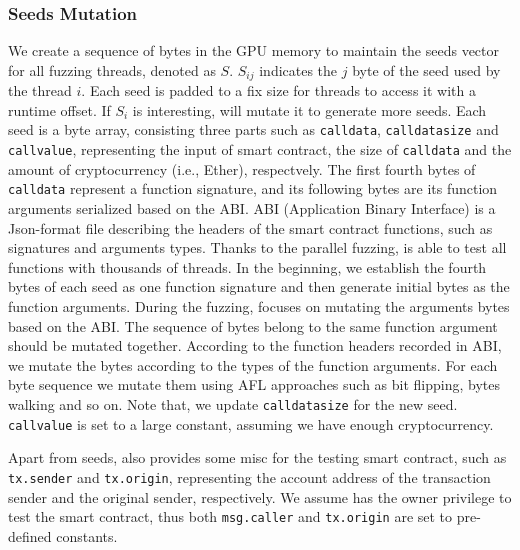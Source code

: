 \subsubsection{Seeds Mutation}
\label{design:mutation}
We create a sequence of bytes in the GPU memory to maintain the seeds vector for all fuzzing threads, denoted as $S$.  
$S_{ij}$ indicates the $j$ byte of the seed used by the thread $i$.  
Each seed is padded to a fix size for threads to access it with a runtime offset.
If $S_i$ is interesting, {\runner} will mutate it to generate more seeds. 
Each seed is a byte array, consisting three parts such as \texttt{calldata}, \texttt{calldatasize} and \texttt{callvalue}, representing the input of smart contract, the size of \texttt{calldata} and the amount of cryptocurrency (i.e., Ether), respectvely.  
%
The first fourth bytes of \texttt{calldata} represent a function signature, and its following bytes are its function arguments serialized based on the ABI.
ABI (Application Binary Interface) is a Json-format file describing the headers of the smart contract functions, such as signatures and arguments types. 
Thanks to the parallel fuzzing, {\runner} is able to test all functions with thousands of threads. 
In the beginning, we establish the fourth bytes of each seed as one function signature and then generate initial bytes as the function arguments.
During the fuzzing, {\runner} focuses on mutating the arguments bytes based on the ABI.
The sequence of bytes belong to the same function argument should be mutated together.
%
%
%
%
%
According to the function headers recorded in ABI, we mutate the bytes according to the types of the function arguments. 
For each byte sequence we mutate them using AFL\cite{afl} approaches such as bit flipping, bytes walking and so on.
Note that, we update \texttt{calldatasize} for the new seed. \texttt{callvalue} is set to a large constant, assuming we have enough cryptocurrency. 

Apart from seeds, {\runner} also provides some misc for the testing smart contract, such as  \texttt{tx.sender} and \texttt{tx.origin}, representing the account address of the transaction sender and the original sender, respectively. 
We assume {\tool} has the owner privilege to test the smart contract, thus both \texttt{msg.caller} and \texttt{tx.origin} are set to pre-defined constants.
    

